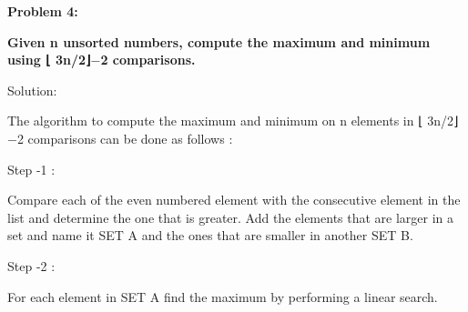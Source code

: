 \documentclass[letterpaper,portrait,12pt]{article}
\begin{document}
\begin{flushleft}
\textbf{Problem 4:}
\end{flushleft}


\begin{flushleft}
\textbf{	}\textbf{Given n unsorted numbers, compute the maximum and minimum using ⌊ 3n/2⌋$-$2 comparisons.}
\end{flushleft}


\begin{flushleft}

\end{flushleft}


\begin{flushleft}
Solution:
\end{flushleft}


\begin{flushleft}

\end{flushleft}


\begin{flushleft}
The algorithm to compute the maximum and minimum on n elements in ⌊ 3n/2⌋$-$2 comparisons can be done as follows :
\end{flushleft}


\begin{flushleft}

\end{flushleft}


\begin{flushleft}
Step -1 :
\end{flushleft}


\begin{flushleft}
Compare each of the even numbered element with the consecutive element in the list and determine the one that is greater. Add the elements that are larger in a set and name it SET A and the ones that are smaller in another SET B.
\end{flushleft}


\begin{flushleft}

\end{flushleft}


\begin{flushleft}
Step -2 :
\end{flushleft}


\begin{flushleft}
For each element in SET A find the maximum by performing a linear search.
\end{flushleft}
\end{document}

